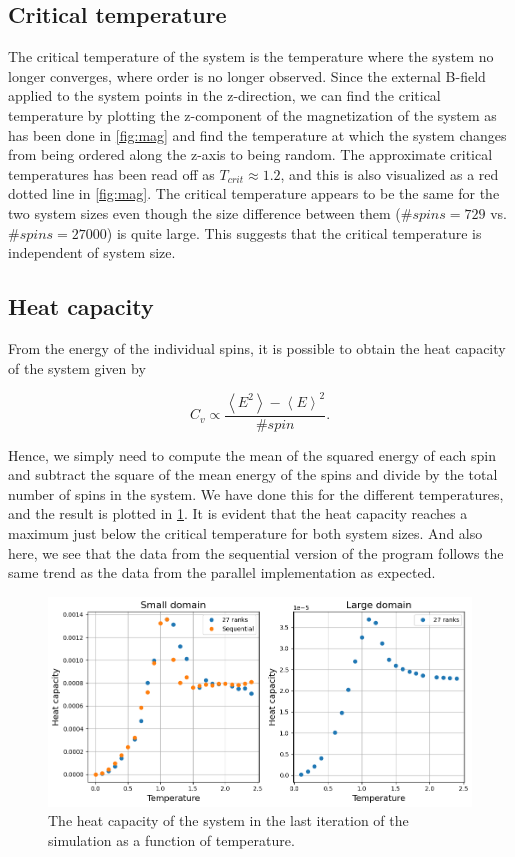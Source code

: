 \documentclass{article}
\begin{document}
\subsection{Critical temperature}
The critical temperature of the system is the temperature where the system no longer converges, where order is no longer observed. Since the external B-field applied to the system points in the z-direction, we can find the critical temperature by plotting the z-component of the magnetization of the system as has been done in \cref{fig:mag} and find the temperature at which the system changes from being ordered along the z-axis to being random. The approximate critical temperatures has been read off as $T_{crit} \approx 1.2$, and this is also visualized as a red dotted line in \cref{fig:mag}. The critical temperature appears to be the same for the two system sizes even though the size difference between them ($\#spins=729$ vs. $\#spins=27000$) is quite large. This suggests that the critical temperature is independent of system size.

\subsection{Heat capacity}
From the energy of the individual spins, it is possible to obtain the heat capacity of the system given by

\begin{equation}
    C_v \propto \frac{\left< E^2 \right> - \left< E \right>^2}{\#spin}.
\end{equation}

Hence, we simply need to compute the mean of the squared energy of each spin and subtract the square of the mean energy of the spins and divide by the total number of spins in the system. We have done this for the different temperatures, and the result is plotted in \cref{fig:heat}. It is evident that the heat capacity reaches a maximum just below the critical temperature for both system sizes. And also here, we see that the data from the sequential version of the program follows the same trend as the data from the parallel implementation as expected.

\begin{figure}[ht!]
    \centering
    \includegraphics[width=.87\textwidth]{Final_project/Report/heat.png}
    \caption{The heat capacity of the system in the last iteration of the simulation as a function of temperature.}
    \label{fig:heat}
\end{figure}
\FloatBarrier
\end{document}
